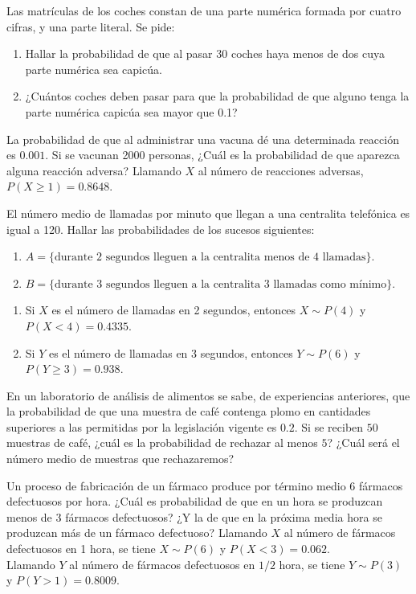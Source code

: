 {Las matrículas de los coches constan de una parte numérica formada por cuatro cifras, y una parte literal. Se pide:

\begin{enumerate}
\item  Hallar la probabilidad de que al pasar 30 coches haya menos de dos cuya parte numérica sea capicúa.
\item  ¿Cuántos coches deben pasar para que la probabilidad de que alguno tenga la parte numérica capicúa sea mayor
que 0.1?
\end{enumerate}
}
{}
{}


{La probabilidad de que al administrar una vacuna dé una determinada reacción es $0.001$. Si se vacunan 2000 personas, ¿Cuál es la probabilidad de que aparezca alguna reacción adversa?
}
{Llamando $X$ al número de reacciones adversas, $P(X\geq 1)=0.8648$.
}
{}


{El número medio de llamadas por minuto que llegan a una centralita telefónica es igual a 120.
Hallar las probabilidades de los sucesos siguientes: 

\begin{enumerate}
\item  $A=\{\text{durante 2 segundos lleguen a la centralita menos de 4 llamadas}\}$.
\item  $B=\{\text{durante 3 segundos lleguen a la centralita 3 llamadas como mínimo}\}$.
\end{enumerate}
}
{
\begin{enumerate}
\item Si $X$ es el número de llamadas en 2 segundos, entonces $X\sim P(4)$ y $P(X<4)=0.4335$.
\item Si $Y$ es el número de llamadas en 3 segundos, entonces $Y\sim P(6)$ y $P(Y\geq 3)=0.938$.
\end{enumerate}
}
{}


{En un laboratorio de análisis de alimentos se sabe, de experiencias anteriores, que la probabilidad de que una muestra de café contenga plomo en cantidades superiores a las permitidas por la legislación vigente es $0.2$. Si se reciben $50$ muestras de café, ¿cuál es la probabilidad de rechazar al menos $5$?
¿Cuál será el número medio de muestras que rechazaremos?
}
{}
{}


{Un proceso de fabricación de un fármaco produce por término medio 6 fármacos defectuosos por hora.
¿Cuál es probabilidad de que en un hora se produzcan menos de 3 fármacos defectuosos?
¿Y la de que en la próxima media hora se produzcan más de un fármaco defectuoso?}
{Llamando $X$ al número de fármacos defectuosos en 1 hora, se tiene $X\sim P(6)$ y $P(X<3)=0.062$.\\
Llamando $Y$ al número de fármacos defectuosos en $1/2$ hora, se tiene $Y\sim P(3)$ y $P(Y>1)=0.8009$.}
{}


